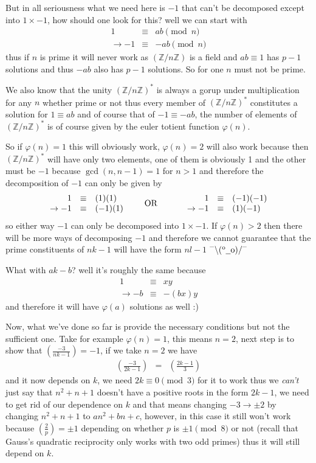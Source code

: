 \documentclass[aps,preprint,preprintnumbers,nofootinbib,showpacs,prd]{revtex4-1}
\newcommand{\nbea}{\begin{eqnarray*}}
\newcommand{\neea}{\end{eqnarray*}}
\newcommand{\dunno}{$ {}^{\mbox {--}}\backslash(^{\rm o}{}\underline{\hspace{0.2cm}}{\rm o})/^{\mbox {--}}$}
\begin{document}
But in all seriousness what we need here is $-1$ that can't be decomposed except into $1\times-1$, how should one look for this? well we can start with
%
\nbea
1 & \equiv & ab \pmod{n} \\
\to -1 & \equiv & -ab \pmod{n}
\neea
%
thus if $n$ is prime it will never work as $(\mathbb{Z}/n\mathbb{Z})$ is a field and $ab \equiv 1$ has $p-1$ solutions and thus $-ab$ also has $p-1$ solutions. So for one $n$ must not be prime.

We also know that the unity $(\mathbb{Z}/n\mathbb{Z})^*$ is always a gorup under multiplication for any $n$ whether prime or not thus every member of $(\mathbb{Z}/n\mathbb{Z})^*$ constitutes a solution for $1 \equiv ab$ and of course that of $-1 \equiv -ab$, the number of elements of $(\mathbb{Z}/n\mathbb{Z})^*$ is of course given by the euler totient function $\varphi(n)$.

So if $\varphi(n)=1$ this will obviously work, $\varphi(n)=2$ will also work because then $(\mathbb{Z}/n\mathbb{Z})^*$ will have only two elements, one of them is obviously 1 and the other must be $-1$ because $\gcd(n,n-1)=1$ for $n > 1$ and therefore the decomposition of $-1$ can only be given by
%
\nbea
\begin{array}{r c l}
1 & \equiv &(1) (1) \\
\to -1 & \equiv & (-1)(1)
\end{array}
& {\rm ~~~~~~OR~~~~~~} &
\begin{array}{r c l}
1 & \equiv &(-1) (-1) \\
\to -1 & \equiv & (1)(-1)
\end{array}
\neea
%
so either way $-1$ can only be decomposed into $1 \times -1$. If $\varphi(n) > 2$ then there will be more ways of decomposing $-1$ and therefore we cannot guarantee that the prime constituents of $nk - 1$ will have the form $nl-1$ \dunno

What with $ak - b$? well it's roughly the same because
%
\nbea
1 & \equiv & xy \\
\to -b & \equiv & -(bx)y
\neea
%
and therefore it will have $\varphi(a)$ solutions as well :)

Now, what we've done so far is provide the necessary conditions but not the sufficient one. Take for example $\varphi(n)=1$, this means $n = 2$, next step is to show that $\left ( \frac{-3}{nk-1}\right) = -1$, if we take $n=2$ we have
%
\nbea
\left ( \frac{-3}{2k-1}\right) & = & \left ( \frac{2k-1}{3}\right)
\neea
%
and it now depends on $k$, we need $2k \equiv 0 \pmod{3}$ for it to work thus we {\it can't} just say that $n^2 + n + 1$ doesn't have a positive roots in the form $2k-1$, we need to get rid of our dependence on $k$ and that means changing $-3 \to \pm 2$ by changing $n^2 + n + 1$ to $an^2 + bn + c$, however, in this case it still won't work because $\left ( \frac{2}{p} \right ) = \pm1$ depending on whether $p$ is $\pm1 \pmod{8}$ or not (recall that Gauss's quadratic reciprocity only works with two odd primes) thus it will still depend on $k$.
\end{document}
